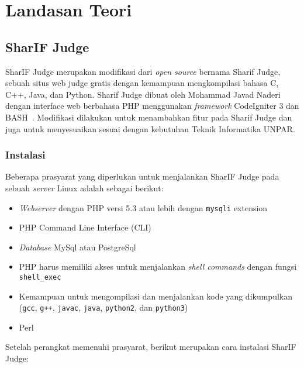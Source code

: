 \chapter{Landasan Teori}
\label{chap:teori}


\section{SharIF Judge}
\label{sec:2:sharifjudge}

SharIF Judge merupakan modifikasi dari \textit{open source} bernama Sharif Judge, sebuah situs web judge gratis dengan kemampuan mengkompilasi bahasa C, C++, Java, dan Python. Sharif Judge dibuat oleh Mohammad Javad Naderi dengan interface web berbahasa PHP menggunakan \textit{framework} CodeIgniter 3 dan BASH~\cite{javed:sharif}. Modifikasi dilakukan untuk menambahkan fitur pada Sharif Judge dan juga untuk menyesuaikan sesuai dengan kebutuhan Teknik Informatika UNPAR.

\subsection{Instalasi}
\label{sub:2:1:instalasi}

Beberapa prasyarat yang diperlukan untuk menjalankan SharIF Judge pada sebuah \textit{server} Linux adalah sebagai berikut:

\begin{itemize}
	\item \textit{Webserver} dengan PHP versi 5.3 atau lebih dengan \texttt{mysqli} extension
	\item PHP Command Line Interface (CLI)
	\item \textit{Database} MySql atau PostgreSql
	\item PHP harus memiliki akses untuk menjalankan \textit{shell commands} dengan fungsi \verb|shell_exec|
	\item Kemampuan untuk mengompilasi dan menjalankan kode yang dikumpulkan (\texttt{gcc}, \texttt{g++}, \texttt{javac}, \texttt{java}, \texttt{python2}, dan \texttt{python3})
	\item Perl
\end{itemize}

Setelah perangkat memenuhi prasyarat, berikut merupakan cara instalasi SharIF Judge:

